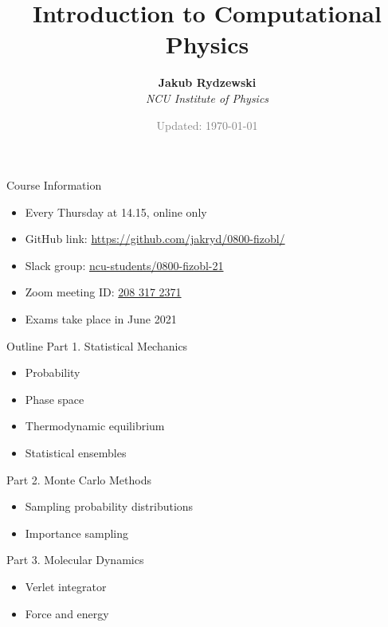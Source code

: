 \documentclass[10pt]{beamer}
\title{Introduction to Computational Physics}
\author{\textbf{Jakub Rydzewski}\\[5pt]
  \footnotesize{\it NCU Institute of Physics}}
\date{\footnotesize\textcolor{gray}{Updated: \today}}
\begin{document}
{\frame{\titlepage}}

\begin{frame}{Course Information}
\begin{itemize}
\setlength\itemsep{1em}
  \item Every Thursday at 14.15, online only
  \item GitHub link: \url{https://github.com/jakryd/0800-fizobl/}
  \item Slack group: \href{https://join.slack.com/t/ncu-students/shared_invite/zt-n1meknwx-_poiBXXMrYVbn9iHDj5rPw}{ncu-students/﻿0800-fizobl-21}
  \item Zoom meeting ID: \href{https://zoom.us/j/2803172371?pwd=NVQ3c1FUZEZhNlZKaVZKSndHWjRaZz09}{208 317 2371}
  \item Exams take place in June 2021
\end{itemize}
\end{frame}

\begin{frame}{Outline}
\textcolor{subtitle}{Part 1. Statistical Mechanics}
\begin{itemize}
  \item Probability
  \item Phase space
  \item Thermodynamic equilibrium
  \item Statistical ensembles
\end{itemize}
\vspace{0.5cm}

\textcolor{subtitle}{Part 2. Monte Carlo Methods}
\begin{itemize}
  \item Sampling probability distributions
  \item Importance sampling
\end{itemize}
\vspace{0.5cm}

\textcolor{subtitle}{Part 3. Molecular Dynamics}
\begin{itemize}
  \item Verlet integrator
  \item Force and energy
\end{itemize}
\end{frame}
\end{document}
